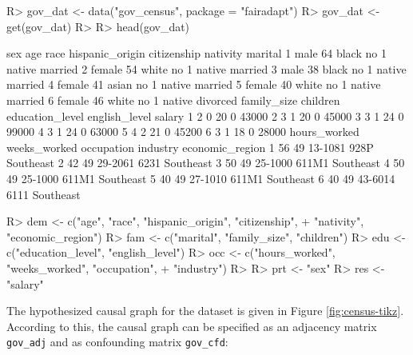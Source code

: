 \documentclass[
  nojss]{jss}
\begin{document}
\begin{CodeChunk}
\begin{CodeInput}
R> gov_dat <- data("gov_census", package = "fairadapt")
R> gov_dat <- get(gov_dat)
R> 
R> head(gov_dat)
\end{CodeInput}
\begin{CodeOutput}
     sex age  race hispanic_origin citizenship nativity  marital
1   male  64 black              no           1   native  married
2 female  54 white              no           1   native  married
3   male  38 black              no           1   native  married
4 female  41 asian              no           1   native  married
5 female  40 white              no           1   native  married
6 female  46 white              no           1   native divorced
  family_size children education_level english_level salary
1           2        0              20             0  43000
2           3        1              20             0  45000
3           3        1              24             0  99000
4           3        1              24             0  63000
5           4        2              21             0  45200
6           3        1              18             0  28000
  hours_worked weeks_worked occupation industry economic_region
1           56           49    13-1081     928P       Southeast
2           42           49    29-2061     6231       Southeast
3           50           49    25-1000    611M1       Southeast
4           50           49    25-1000    611M1       Southeast
5           40           49    27-1010    611M1       Southeast
6           40           49    43-6014     6111       Southeast
\end{CodeOutput}
\begin{CodeInput}
R> dem <- c("age", "race", "hispanic_origin", "citizenship",
+          "nativity", "economic_region")
R> fam <- c("marital", "family_size", "children")
R> edu <- c("education_level", "english_level")
R> occ <- c("hours_worked", "weeks_worked", "occupation",
+          "industry")
R> 
R> prt <- "sex"
R> res <- "salary"
\end{CodeInput}
\end{CodeChunk}

The hypothesized causal graph for the dataset is given in Figure
\ref{fig:census-tikz}. According to this, the causal graph can be
specified as an adjacency matrix \texttt{gov\_adj} and as confounding
matrix \texttt{gov\_cfd}:
\end{document}
